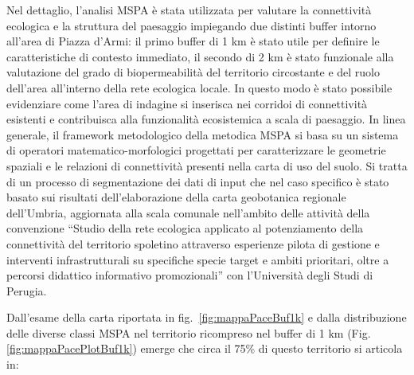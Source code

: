 \documentclass[
  a4paper,
]{book}
\begin{document}
Nel dettaglio, l'analisi MSPA è stata utilizzata per valutare la connettività ecologica e la struttura del paesaggio impiegando due distinti buffer intorno all'area di Piazza d'Armi: il primo buffer di 1 km è stato utile per definire le caratteristiche di contesto immediato, il secondo di 2 km è stato funzionale alla valutazione del grado di biopermeabilità del territorio circostante e del ruolo dell'area all'interno della rete ecologica locale. In questo modo è stato possibile evidenziare come l'area di indagine si inserisca nei corridoi di connettività esistenti e contribuisca alla funzionalità ecosistemica a scala di paesaggio. In linea generale, il framework metodologico della metodica MSPA si basa su un sistema di operatori matematico-morfologici progettati per caratterizzare le geometrie spaziali e le relazioni di connettività presenti nella carta di uso del suolo. Si tratta di un processo di segmentazione dei dati di input che nel caso specifico è stato basato sui risultati dell'elaborazione della carta geobotanica regionale dell'Umbria, aggiornata alla scala comunale nell'ambito delle attività della convenzione ``Studio della rete ecologica applicato al potenziamento della connettività del territorio spoletino attraverso esperienze pilota di gestione e interventi infrastrutturali su specifiche specie target e ambiti prioritari, oltre a percorsi didattico informativo promozionali'' con l'Università degli Studi di Perugia.

Dall'esame della carta riportata in fig.~\ref{fig:mappaPaceBuf1k} e dalla distribuzione delle diverse classi MSPA nel territorio ricompreso nel buffer di 1 km (Fig. \ref{fig:mappaPacePlotBuf1k}) emerge che circa il 75\% di questo territorio si articola in:
\end{document}
